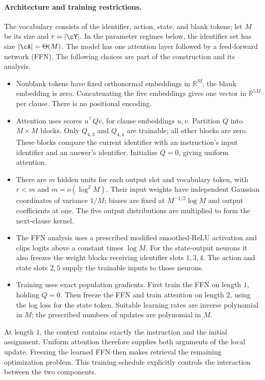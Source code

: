 \documentclass[11pt,twoside]{article}
\newcommand{\R}{\mathbb R}
\theoremstyle{definition}
\theoremstyle{remark}
\begin{document}
\paragraph{Architecture and training restrictions.}
The vocabulary consists of the identifier, action, state, and blank tokens;
let $M$ be its size and $r=|\cY|$. In the parameter regimes below,
the identifier set has size $|\cA|=\Theta(M)$.
The model has one attention layer followed by a feed-forward network (FFN).
The following choices are part of the construction and its analysis.
\begin{itemize}[leftmargin=*]
\item Nonblank tokens have fixed orthonormal embeddings in $\R^M$; the
blank embedding is zero. Concatenating the five embeddings gives one
vector in $\R^{5M}$ per clause. There is no positional encoding.
\item Attention uses scores $u^\top Qv$, for clause embeddings $u,v$.
Partition $Q$ into $M\times M$ blocks. Only $Q_{4,3}$ and $Q_{4,4}$ are
trainable; all other blocks are zero. These blocks compare the current
identifier with an instruction's input identifier and an answer's identifier.
Initialize $Q=0$, giving uniform attention.
\item There are $m$ hidden units for each output slot and vocabulary token,
with $r<m$ and $m=o(\log^2 M)$. Their input weights have independent
Gaussian coordinates of variance $1/M$; biases are fixed at
$M^{-1/2}\log M$ and output coefficients at one. The five output
distributions are multiplied to form the next-clause kernel.
\item The FFN analysis uses a prescribed modified smoothed-ReLU activation
and clips logits above a constant times $\log M$. For the state-output
neurons it also freezes the weight blocks receiving identifier slots
$1,3,4$. The action and state slots $2,5$ supply the trainable inputs to
those neurons.
\item Training uses exact population gradients. First train the FFN on
length $1$, holding $Q=0$. Then freeze the FFN and train attention on
length $2$, using the log loss for the state token. Suitable learning
rates are inverse polynomial in $M$; the prescribed numbers of updates
are polynomial in $M$.
\end{itemize}
At length $1$, the context contains exactly the instruction and the initial
assignment. Uniform attention therefore supplies both arguments of the
local update. Freezing the learned FFN then makes retrieval the remaining
optimization problem. This training schedule explicitly controls the
interaction between the two components.
\end{document}
